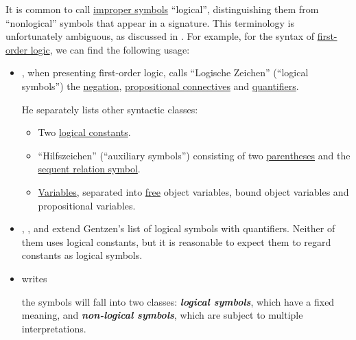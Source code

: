 \begin{remark}\label{rem:logical_symbol_terminology}
  It is common to call \hyperref[con:improper_symbol]{improper symbols} \enquote{logical}, distinguishing them from \enquote{nonlogical} symbols that appear in a signature. This terminology is unfortunately ambiguous, as discussed in \cite{MathSE:are_variables_logical_symbols}. For example, for the syntax of \hyperref[def:first_order_logic]{first-order logic}, we can find the following usage:
  \begin{itemize}
    \item \Textcite[178]{Gentzen1935LogischeSchließen}, when presenting first-order logic, calls \enquote{Logische Zeichen} (\enquote{logical symbols}) the \hyperref[def:propositional_alphabet/negation]{negation}, \hyperref[def:propositional_alphabet/connectives]{propositional connectives} and \hyperref[def:predicate_logic_alphabet/quantifiers]{quantifiers}.

    He separately lists other syntactic classes:
    \begin{itemize}
      \item Two \hyperref[def:propositional_alphabet/constants]{logical constants}.
      \item \enquote{Hilfszeichen} (\enquote{auxiliary symbols}) consisting of two \hyperref[def:propositional_alphabet/parentheses]{parentheses} and the \hyperref[def:sequent_alphabet]{sequent relation symbol}.
      \item \hyperref[con:variable]{Variables}, separated into \hyperref[con:variable_binding]{free} object variables, bound object variables and propositional variables.
    \end{itemize}

    \item \Textcite[69]{Kleene1971Metamathematics}, \textcite[57]{КолмогоровДрагалин2006ЛогикаВведение}, \textcite[140]{Мальцев1970АлгебраическиеСистемы} and \textcite[86]{Герасимов2014Вычислимость} extend Gentzen's list of logical symbols with quantifiers. Neither of them uses logical constants, but it is reasonable to expect them to regard constants as logical symbols.

    \item \Textcite*[2]{Hinman2005Logic} writes
    \begin{displayquote}
      \textellipsis the symbols will fall into two classes: \textit{\textbf{logical symbols}}, which have a fixed meaning, and \textit{\textbf{non-logical symbols}}, which are subject to multiple interpretations.
    \end{displayquote}


\end{itemize}
\end{remark}
